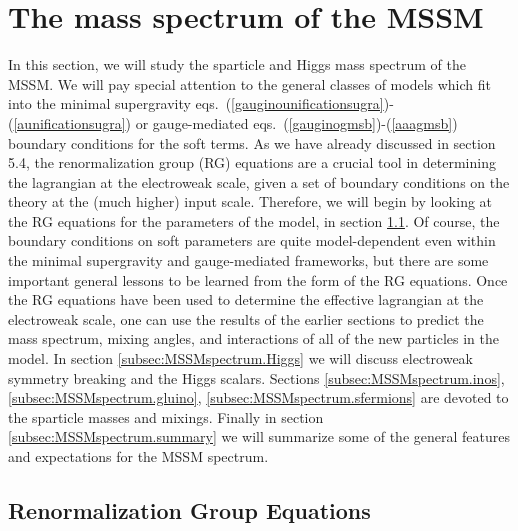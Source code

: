 \section{The mass spectrum of the MSSM}\label{sec:MSSMspectrum}
\setcounter{equation}{0}
\setcounter{footnote}{1}

In this section, we will study the sparticle and Higgs mass spectrum of
the MSSM. We will pay
special attention to the general classes of models which fit into the
minimal supergravity
eqs.~(\ref{gauginounificationsugra})-(\ref{aunificationsugra})
or gauge-mediated
eqs.~(\ref{gauginogmsb})-(\ref{aaagmsb}) boundary conditions for the soft
terms.
As we have already discussed in section 5.4, the renormalization group
(RG) equations are a crucial tool in determining the lagrangian at the
electroweak scale, given a set of boundary conditions on the theory at
the (much higher) input scale.
Therefore, we will begin by looking at the RG equations for the parameters
of the model, in section \ref{subsec:MSSMspectrum.rges}. 
Of course, the boundary conditions
on soft parameters are quite model-dependent even within the
minimal supergravity and gauge-mediated frameworks, but there
are some important
general
lessons to be learned from the form of the RG equations.
Once the RG equations have been used to determine the effective lagrangian
at the electroweak scale, one can use the results of the earlier sections
to predict the mass spectrum, mixing angles, and interactions of all of
the new particles in the model.
In section \ref{subsec:MSSMspectrum.Higgs} we will discuss electroweak
symmetry breaking and the Higgs scalars. Sections
\ref{subsec:MSSMspectrum.inos},
\ref{subsec:MSSMspectrum.gluino},
\ref{subsec:MSSMspectrum.sfermions}
are devoted to the sparticle masses and mixings. Finally in section
\ref{subsec:MSSMspectrum.summary} we will summarize some of the general
features and expectations for
the MSSM spectrum.

\subsection{Renormalization Group
Equations}\label{subsec:MSSMspectrum.rges}

